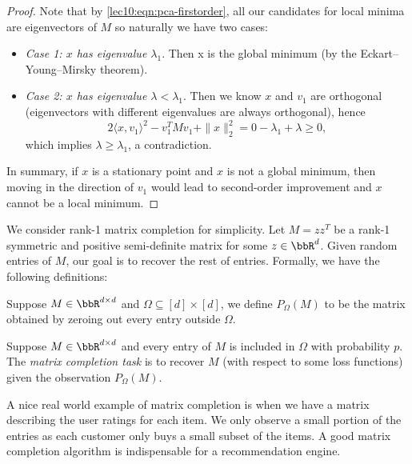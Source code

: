\begin{definition} 
\begin{proof}
Note that by \eqref{lec10:eqn:pca-firstorder}, all our candidates for local minima are eigenvectors of $M$ so naturally we have two cases:
\begin{itemize}
\item \textit{Case 1: $x$ has eigenvalue $\lambda_1$}. Then x is the global minimum (by the Eckart–Young–Mirsky theorem).
\item \textit{Case 2: $x$ has eigenvalue $\lambda < \lambda_1$}. Then we know $x$ and $v_1$ are orthogonal (eigenvectors with different eigenvalues are always orthogonal), hence 
\begin{equation}
2\langle x, v_1 \rangle^2 - v_1^TMv_1 + \|x\|_2^2 = 0  -\lambda_1 + \lambda \geq 0,
\end{equation}
which implies $\lambda \geq \lambda_1$, a contradiction. 
\end{itemize}

In summary, if $x$ is a stationary point and $x$ is not a global minimum, then moving in the direction of $v_1$ would lead to second-order improvement and $x$ cannot be a local minimum. 
\end{proof}

We consider rank-1 matrix completion for simplicity. Let $M = zz^T$ be a rank-1 symmetric and positive semi-definite matrix for some $z\in \bbR^d$. Given random entries of $M$, our goal is to recover the rest of entries. Formally, we have the following definitions:

\begin{definition}
Suppose $M\in \bbR^{d\times d}$ and $\Omega \subseteq [d] \times [d]$, we define $P_{\Omega}(M)$ to be the matrix obtained by zeroing out every entry outside $\Omega$. 
\end{definition}

\begin{definition}
Suppose $M\in \bbR^{d\times d}$ and every entry of $M$ is included in $\Omega$ with probability $p$. The \textit{matrix completion task} is to recover $M$ (with respect to some loss functions) given the observation $P_{\Omega}(M)$.
\end{definition}

A nice real world example of matrix completion is when we have a matrix describing the user ratings for each item. We only observe a small portion of the entries as each customer only buys a small subset of the items. A good matrix completion algorithm is indispensable for a recommendation engine. 


\end{definition}
